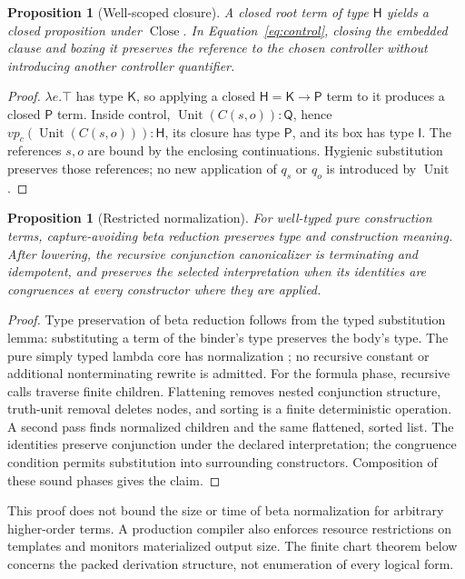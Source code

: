 \documentclass[11pt,a4paper]{article}
\newtheorem{proposition}[definition]{Proposition}
\newcommand{\Prop}{\mathsf{P}}
\newcommand{\Int}{\mathsf{I}}
\newcommand{\Q}{\mathsf{Q}}
\newcommand{\HH}{\mathsf{H}}
\newcommand{\KK}{\mathsf{K}}
\newcommand{\Close}{\operatorname{Close}}
\newcommand{\Unit}{\operatorname{Unit}}
\begin{document}
\begin{proposition}[Well-scoped closure]
A closed root term of type \(\HH\) yields a closed proposition under
\(\Close\). In Equation~\eqref{eq:control}, closing the embedded clause and
boxing it preserves the reference to the chosen controller without
introducing another controller quantifier.
\end{proposition}
\begin{proof}
\(\lambda e.\top\) has type \(\KK\), so applying a closed
\(\HH=\KK\to\Prop\) term to it produces a closed \(\Prop\) term.
Inside control, \(\Unit(C(s,o)):\Q\), hence
\(vp_c(\Unit(C(s,o))):\HH\), its closure has type \(\Prop\), and its
box has type \(\Int\). The references \(s,o\) are bound by the enclosing
continuations. Hygienic substitution preserves those references; no new
application of \(q_s\) or \(q_o\) is introduced by \(\Unit\).
\end{proof}

\begin{proposition}[Restricted normalization]
For well-typed pure construction terms, capture-avoiding beta reduction
preserves type and construction meaning. After lowering, the recursive
conjunction canonicalizer is terminating and idempotent, and preserves the
selected interpretation when its identities are congruences at every
constructor where they are applied.
\end{proposition}
\begin{proof}
Type preservation of beta reduction follows from the typed substitution
lemma: substituting a term of the binder's type preserves the body's type.
The pure simply typed lambda core has normalization \cite{tapl}; no recursive constant
or additional nonterminating rewrite is admitted. For the formula phase,
recursive calls traverse finite children. Flattening removes nested
conjunction structure, truth-unit removal deletes nodes, and sorting is a
finite deterministic operation. A second pass finds normalized children and
the same flattened, sorted list. The identities preserve conjunction under
the declared interpretation; the congruence condition permits substitution
into surrounding constructors. Composition of these sound phases gives the
claim.
\end{proof}

This proof does not bound the size or time of beta normalization for arbitrary
higher-order terms. A production compiler also enforces resource restrictions
on templates and monitors materialized output size. The finite chart theorem
below concerns the packed derivation structure, not enumeration of every
logical form.
\end{document}
